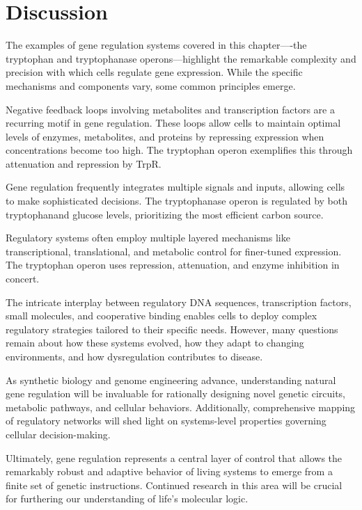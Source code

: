 \section{Discussion}

The examples of gene regulation systems covered in this chapter----the tryptophan and tryptophanase operons---highlight the remarkable complexity and precision with which cells regulate gene expression. While the specific mechanisms and components vary, some common principles emerge.

Negative feedback loops involving metabolites and transcription factors are a recurring motif in gene regulation. These loops allow cells to maintain optimal levels of enzymes, metabolites, and proteins by repressing expression when concentrations become too high. The tryptophan operon exemplifies this through attenuation and repression by TrpR.

Gene regulation frequently integrates multiple signals and inputs, allowing cells to make sophisticated decisions. The tryptophanase operon is regulated by both tryptophanand glucose levels, prioritizing the most efficient carbon source.

Regulatory systems often employ multiple layered mechanisms like transcriptional, translational, and metabolic control for finer-tuned expression. The tryptophan operon uses repression, attenuation, and enzyme inhibition in concert.

The intricate interplay between regulatory DNA sequences, transcription factors, small molecules, and cooperative binding enables cells to deploy complex regulatory strategies tailored to their specific needs. However, many questions remain about how these systems evolved, how they adapt to changing environments, and how dysregulation contributes to disease.

As synthetic biology and genome engineering advance, understanding natural gene regulation will be invaluable for rationally designing novel genetic circuits, metabolic pathways, and cellular behaviors. Additionally, comprehensive mapping of regulatory networks will shed light on systems-level properties governing cellular decision-making.

Ultimately, gene regulation represents a central layer of control that allows the remarkably robust and adaptive behavior of living systems to emerge from a finite set of genetic instructions. Continued research in this area will be crucial for furthering our understanding of life's molecular logic.
